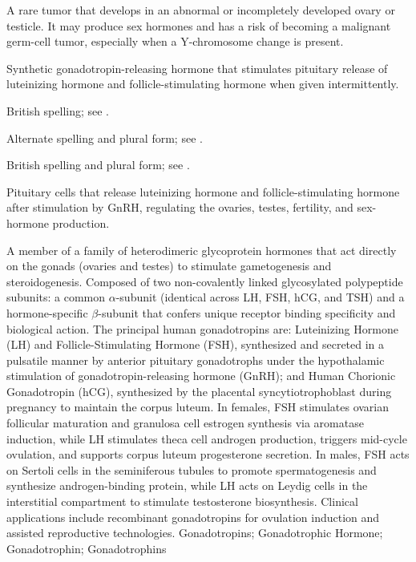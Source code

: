  A rare tumor that develops in an abnormal or incompletely developed ovary or testicle. It may produce sex hormones and has a risk of becoming a malignant germ-cell tumor, especially when a Y-chromosome change is present.

 Synthetic gonadotropin-releasing hormone that stimulates pituitary release of luteinizing hormone and follicle-stimulating hormone when given intermittently.

 British spelling; see .

 Alternate spelling and plural form; see .

 British spelling and plural form; see .

 Pituitary cells that release luteinizing hormone and follicle-stimulating hormone after stimulation by GnRH, regulating the ovaries, testes, fertility, and sex-hormone production.

 A member of a family of heterodimeric glycoprotein hormones that act directly on the gonads (ovaries and testes) to stimulate gametogenesis and steroidogenesis. Composed of two non-covalently linked glycosylated polypeptide subunits: a common $\alpha$-subunit (identical across LH, FSH, hCG, and TSH) and a hormone-specific $\beta$-subunit that confers unique receptor binding specificity and biological action. The principal human gonadotropins are: Luteinizing Hormone (LH) and Follicle-Stimulating Hormone (FSH), synthesized and secreted in a pulsatile manner by anterior pituitary gonadotrophs under the hypothalamic stimulation of gonadotropin-releasing hormone (GnRH); and Human Chorionic Gonadotropin (hCG), synthesized by the placental syncytiotrophoblast during pregnancy to maintain the corpus luteum. In females, FSH stimulates ovarian follicular maturation and granulosa cell estrogen synthesis via aromatase induction, while LH stimulates theca cell androgen production, triggers mid-cycle ovulation, and supports corpus luteum progesterone secretion. In males, FSH acts on Sertoli cells in the seminiferous tubules to promote spermatogenesis and synthesize androgen-binding protein, while LH acts on Leydig cells in the interstitial compartment to stimulate testosterone biosynthesis. Clinical applications include recombinant gonadotropins for ovulation induction and assisted reproductive technologies.
\synonyms
Gonadotropins; Gonadotrophic Hormone; Gonadotrophin; Gonadotrophins

